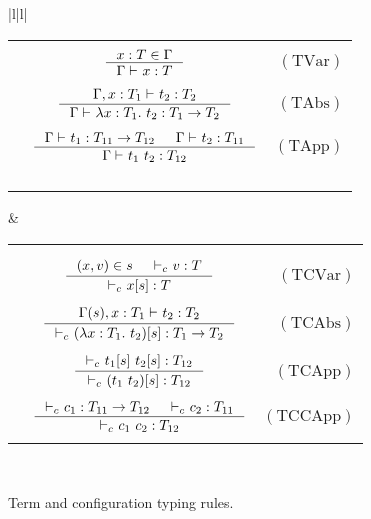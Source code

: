 \documentclass {article}
\newcommand\rulename[1]{\mathrm{(#1)}}
\newcommand{\app}[2]{#1 \ #2}
\newcommand{\appD}{t_1 \ t_2}
\newcommand{\absD}{\lambda x:T_1. \ t_2}
\newcommand{\conf}[2][s]{(#2)[#1]}
\newcommand{\env}{{\Gamma \vdash \ }}
\newcommand{\envE}{{\Gamma , x:T_1 \vdash \ }}
\newcommand{\envEC}{{\Gamma(s) , x:T_1 \vdash \ }}
\newcommand{\tyC}{{\vdash_c \ }}
\begin{document}
\begin{figure}
\begin{small}
\begin{center}
\hspace*{-1.8cm}
\begin{tabular}{|l|l|}
\hline
\begin{tabular}{l c r}
&&\framebox {$\env t:T$}\\
&$\inference {x:T \in \Gamma}{\env x:T}$&$\rulename{TVar}$\\
&&\\
&$\inference {\envE t_2:T_2}{\env \absD:T_1 \to T_2}$&$\rulename{TAbs}$\\
&&\\
&$\inference {\env t_1 : T_{11} \to T_{12} & \env t_2 : T_{11}}{\env \appD : T_{12}}$&$\rulename{TApp}$\\
&&\\
&&\\
&&\\
&&\\
\end{tabular}&
\begin{tabular}{l c r}
&&\\
&&\framebox {$\tyC c:T$}\\
&$\inference {(x,v) \in s  & \tyC v:T}{\tyC x[s]:T}$&$\rulename{TCVar}$\\
&&\\
&$\inference {\envEC t_2:T_2}{\tyC \conf{\absD} :T_1\to T_2}$&$\rulename{TCAbs}$\\
&&\\
&$\inference {\tyC  t_1 [s] \ t_2 [s]:T_{12}}{\tyC  \conf{\appD} : T_{12}}$&$\rulename{TCApp}$\\
&&\\
&$\inference {\tyC c_1 : T_{11} \to T_{12} & \tyC c_2 : T_{11}}{\tyC   \app {c_1}{c_2} : T_{12}}$&$\rulename{TCCApp}$\\
&&\\
\end{tabular}\\
\hline
\end{tabular}
\hspace*{-1cm}
\caption{Term and configuration typing rules.}
\label{tabla:sencillaA}
\end{center}

\end{small}
\end{figure}
\end{document}

